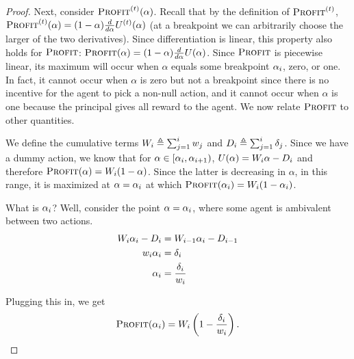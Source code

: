\documentclass{article}
\newcommand{\Derivative}[1]{\frac{d}{d#1}}
\newcommand{\TransferCoefficient}{\alpha}
\newcommand{\Profit}{\textsc{Profit}}
\newcommand{\TypedProfit}[1]{\Profit^{(#1)}}
\newcommand{\Utility}{U}
\begin{document}
\begin{proof}
Next, consider $\TypedProfit{t}(\TransferCoefficient)$. Recall that by the definition of $\TypedProfit{t}$, $\TypedProfit{t}(\TransferCoefficient) = (1 - \TransferCoefficient) \Derivative{\TransferCoefficient} \Utility^{(t)}(\TransferCoefficient)$ (at a breakpoint we can arbitrarily choose the larger of the two derivatives). Since differentiation is linear, this property also holds for $\Profit$: $\Profit(\TransferCoefficient) = (1 - \TransferCoefficient) \Derivative{\TransferCoefficient} \Utility(\TransferCoefficient)$. Since $\Profit$ is piecewise linear, its maximum will occur when $\TransferCoefficient$ equals some breakpoint $\alpha_{i}$, zero, or one. In fact, it cannot occur when $\TransferCoefficient$ is zero but not a breakpoint since there is no incentive for the agent to pick a non-null action, and it cannot occur when $\TransferCoefficient$ is one because the principal gives all reward to the agent. We now relate $\Profit$ to other quantities.

We define the cumulative terms $W_{i} \triangleq \sum_{j = 1}^{i} w_{j}$ and $D_{i} \triangleq \sum_{j=1}^{i} \delta_{j}$. Since we have a dummy action, we know that for $\TransferCoefficient \in [\Breakpoint{i}, \Breakpoint{i+1})$, $\Utility(\TransferCoefficient) = \CumulativeCoefficientJump{i} \TransferCoefficient - \CumulativeBiasDrop{i}$ and therefore $\Profit(\TransferCoefficient) = \CumulativeCoefficientJump{i} (1 - \TransferCoefficient)$. Since the latter is decreasing in $\TransferCoefficient$, in this range, it is maximized at $\TransferCoefficient = \Breakpoint{i}$ at which $\Profit(\Breakpoint{i}) = \CumulativeCoefficientJump{i} (1 - \Breakpoint{i})$.

What is $\alpha_{i}$? Well, consider the point $\TransferCoefficient = \Breakpoint{i}$, where some agent is ambivalent between two actions.
\begin{align*}
  W_{i} \alpha_{i} - D_{i} &= W_{i-1} \alpha_{i} - D_{i-1} \\
  w_{i} \alpha_{i} &= \delta_{i} \\
  \alpha_{i} &= \frac{\delta_{i}}{w_{i}}
\end{align*}

Plugging this in, we get
\begin{equation}
\label{eq:rev-form1}
  \Profit(\Breakpoint{i}) = \CumulativeCoefficientJump{i} \left(1 - \frac{\BiasDrop{i}}{\CoefficientJump{i}} \right)
  \text{.}
\end{equation}


\end{proof}
\end{document}
